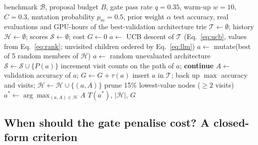 \documentclass{sadhana}
\newcommand{\rmg}{ArchTree-RMG}
\begin{document}
\begin{algorithm}[t]
\caption{\rmg{}: trie search with rank-normalised UCB, mutation and the label-free zero-cost gate}\label{alg:archtree}
\footnotesize
\begin{algorithmic}[1]
\Require benchmark $\mathcal{B}$, proposal budget $B$, gate pass rate $q=0.35$, warm-up $w=10$, $C=0.3$, mutation probability $p_m=0.5$, prior weight $\alpha$
\Ensure test accuracy, real evaluations and GPU-hours of the best-validation architecture
\State trie $\mathcal{T}\gets\emptyset$; history $\mathcal{H}\gets\emptyset$; scores $\mathcal{S}\gets\emptyset$; cost $G\gets 0$
  \State $a\gets$ UCB descent of $\mathcal{T}$ (Eq.~\ref{eq:ucb}, values from Eq.~\ref{eq:rank}; unvisited children ordered by Eq.~\ref{eq:llm})
    \State $a\gets$ mutate(best of 5 random members of $\mathcal{H}$)
  \EndIf
   \State $a\gets$ random unevaluated architecture \EndIf
    \State $\mathcal{S}\gets\mathcal{S}\cup\{P(a)\}$ 
     \State increment visit counts on the path of $a$; \textbf{continue} \EndIf
  \EndIf
  \State $A\gets$ validation accuracy of $a$; $G\gets G+\tau(a)$ 
  \State insert $a$ in $\mathcal{T}$; back up $\max$ accuracy and visits; $\mathcal{H}\gets\mathcal{H}\cup\{(a,A)\}$
   \State prune 15\% lowest-value nodes ($\ge 2$ visits) \EndIf
\EndFor
\State $a^{*}\gets\arg\max_{(a,A)\in\mathcal{H}}A$
\State \Return $T(a^{*})$, $|\mathcal{H}|$, $G$
\end{algorithmic}
\end{algorithm}

\subsection{When should the gate penalise cost? A closed-form criterion}\label{sec:criterion}
\end{document}
